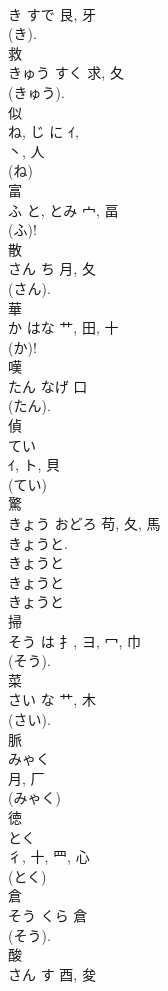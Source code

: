 \documentclass[8pt]{extreport}
\begin{document}
\begin{CJK}{UTF8}{min}
\\	き	すで	艮, 牙	
\\	(き).	
\\	救	
\\	きゅう	すく	求, 夂	
\\	(きゅう).
\\	似	
\\	ね, じ	に	ｲ, 
\\	丶, 人	
\\	(ね) 
\\	富	
\\	ふ	と, とみ	宀, 畐	
\\	(ふ)! 
\\	散	
\\	さん	ち	月, 夂		
\\	(さん). 
\\	華	
\\	か	はな	艹, 田, 十	
\\	(か)!	
\\	嘆	
\\	たん	なげ	口		
\\	(たん). 
\\	偵	
\\	てい	
\\	ｲ, ト, 貝	
\\	(てい) 
\\	驚	
\\	きょう	おどろ	苟, 夂, 馬	
\\	きょうと. 
\\	きょうと 
\\	きょうと 
\\	きょうと 
\\	掃	
\\	そう	は	扌, ヨ, 冖, 巾	
\\	(そう). 
\\	菜	
\\	さい	な	艹, 木		
\\	(さい). 
\\	脈	
\\	みゃく	
\\	月, 厂		
\\	(みゃく) 
\\	徳	
\\	とく	
\\	彳, 十, 罒, 心	
\\	(とく) 
\\	倉	
\\	そう	くら	倉	
\\	(そう). 
\\	酸	
\\	さん	す	酉, 夋	

\end{CJK}
\end{document}

